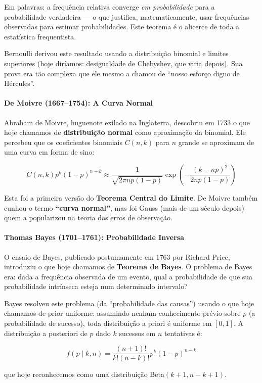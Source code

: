 \documentclass{tufte-handout}
\begin{document}
Em palavras: a frequência relativa converge \textit{em probabilidade} para a probabilidade
verdadeira --- o que justifica, matematicamente, usar frequências observadas para estimar
probabilidades. Este teorema é o alicerce de toda a estatística frequentista.

Bernoulli derivou este resultado usando a distribuição binomial e limites superiores
(hoje diríamos: desigualdade de Chebyshev, que viria depois). Sua prova era tão complexa
que ele mesmo a chamou de ``nosso esforço digno de Hércules''.

\paragraph{De Moivre (1667--1754): A Curva Normal}

Abraham de Moivre, huguenote exilado na Inglaterra, descobriu em 1733 o que hoje chamamos
de \textbf{distribuição normal} como aproximação da binomial. Ele percebeu que os coeficientes
binomiais $C(n,k)$ para $n$ grande se aproximam de uma curva em forma de sino:

\[
C(n,k) p^k (1-p)^{n-k} \approx \frac{1}{\sqrt{2\pi np(1-p)}} \exp\left(-\frac{(k-np)^2}{2np(1-p)}\right)
\]

Esta foi a primeira versão do \textbf{Teorema Central do Limite}. De Moivre também cunhou
o termo \textbf{``curva normal''}, mas foi Gauss (mais de um século depois) quem a popularizou
na teoria dos erros de observação.

\paragraph{Thomas Bayes (1701--1761): Probabilidade Inversa}

O ensaio de Bayes, publicado postumamente em 1763 por Richard Price, introduziu o que hoje
chamamos de \textbf{Teorema de Bayes}. O problema de Bayes era: dada a frequência observada
de um evento, qual a probabilidade de que sua probabilidade intrínseca esteja num determinado
intervalo?

Bayes resolveu este problema (da ``probabilidade das causas'') usando o que hoje chamamos
de prior uniforme: assumindo nenhum conhecimento prévio sobre $p$ (a probabilidade de sucesso),
toda distribuição a priori é uniforme em $[0,1]$. A distribuição a posteriori de $p$ dado
$k$ sucessos em $n$ tentativas é:

\[
f(p \mid k, n) = \frac{(n+1)!}{k!(n-k)!} p^k (1-p)^{n-k}
\]

que hoje reconhecemos como uma distribuição Beta$(k+1, n-k+1)$.
\end{document}
